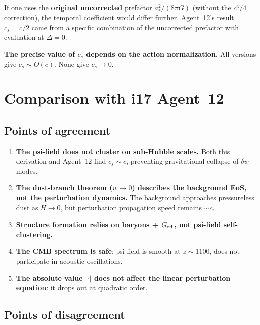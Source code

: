 \documentclass[aps,prd,twocolumn,nofootinbib]{revtex4-2}
\newcommand{\astar}{a_*}
\newcommand{\dpsi}{\delta\psi}
\begin{document}
If one uses the \textbf{original uncorrected} prefactor $\astar^2/(8\pi G)$
(without the $c^4/4$ correction), the temporal coefficient would differ
further. Agent~12's result $c_s = c/2$ came from a specific combination
of the uncorrected prefactor with evaluation at $\bar\Delta = 0$.

\textbf{The precise value of $c_s$ depends on the action normalization.}
All versions give $c_s \sim O(c)$. None give $c_s \to 0$.

\section{Comparison with i17 Agent~12}
\label{sec:comparison}

\subsection{Points of agreement}

\begin{enumerate}
\item \textbf{The psi-field does not cluster on sub-Hubble scales.}
Both this derivation and Agent~12 find $c_s \sim c$, preventing
gravitational collapse of $\dpsi$ modes.

\item \textbf{The dust-branch theorem ($w \to 0$) describes the
background EoS, not the perturbation dynamics.} The background
approaches pressureless dust as $H \to 0$, but perturbation
propagation speed remains $\sim c$.

\item \textbf{Structure formation relies on baryons + $G_{\rm eff}$,
not psi-field self-clustering.}

\item \textbf{The CMB spectrum is safe}: psi-field is smooth at
$z \sim 1100$, does not participate in acoustic oscillations.

\item \textbf{The absolute value $|\cdot|$ does not affect the
linear perturbation equation}: it drops out at quadratic order.
\end{enumerate}

\subsection{Points of disagreement}
\end{document}

